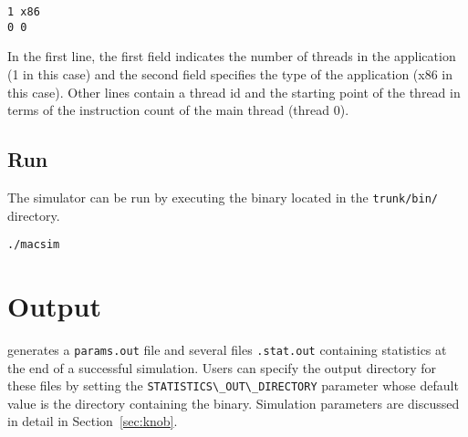 \begin{Verbatim}
1 x86
0 0
\end{Verbatim}

\noindent In the first line, the first field indicates the number of threads in
the application (1 in this case) and the second field specifies the type of the
application (x86 in this case). Other lines contain a thread id and the starting 
point of the thread in terms of the instruction count of the main thread
(thread 0).




\subsection{Run}

The \SIM simulator can be run by executing the \bin binary located in the
\Verb+trunk/bin/+ directory.

\begin{Verbatim}
./macsim
\end{Verbatim}



\section{Output}

\SIM generates a \Verb+params.out+ file and several files \Verb+.stat.out+
containing statistics at the end of a successful simulation. Users can specify
the output directory for these files by setting the
\Verb+STATISTICS\_OUT\_DIRECTORY+ parameter whose default value is the
directory containing the \bin binary. Simulation parameters are discussed in
detail in Section~\ref{sec:knob}.


